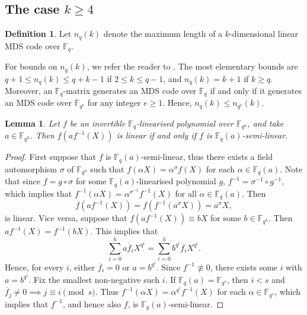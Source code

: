 \documentclass[a4paper]{article}
\newtheorem{lm}[thm]{Lemma}
\theoremstyle{definition}
\newtheorem{df}[thm]{Definition}
\newcommand{\FF}{\mathbb F}
\begin{document}
\subsection{The case $k \geq 4$}

\begin{df}
 Let \( n_q(k) \) denote the maximum length of a $k$-dimensional linear MDS code over $\FF_q$.
\end{df}

For bounds on \(n_q(k)\), we refer the reader to \cite{balllavrauw19}.
The most elementary bounds are \( q+1 \leq n_q(k)  \leq q+k-1 \) if $2 \leq k \leq q-1$, and $n_q(k) = k+1$ if $k \geq q$.
Moreover, an $\FF_q$-matrix generates an MDS code over $\FF_q$ if and only if it generates an MDS code over $\FF_{q^e}$ for any integer $e \geq 1$.
Hence, \( n_q(k) \leq n_{q^e}(k) \).

\begin{lm}
 \label{LmSemiLin}
 Let $f$ be an invertible $\FF_q$-linearised polynomial over $\FF_{q^h}$, and take $a \in \FF_{q^h}$.
 Then $f(a f^{-1}(X))$ is linear if and only if $f$ is $\FF_q(a)$-semi-linear.
\end{lm}

\begin{proof}
First suppose that $f$ is $\FF_q(a)$-semi-linear, thus there exists a field automorphism $\sigma$ of $\FF_{q^h}$ such that $f(\alpha X) = \alpha^\sigma f(X)$ for each $\alpha \in \FF_q(a)$.
Note that since $f = g \circ \sigma$ for some $\FF_q(a)$-linearised polynomial $g$, $f^{-1} = \sigma^{-1} \circ g^{-1}$, which implies that \( f^{-1}(\alpha X) = \alpha^{\sigma^{-1}} f^{-1}(X) \) for all $\alpha \in \FF_q(a)$.
Then
\[
 f( a f^{-1}(X)) = f ( f^{-1} (a^\sigma X)) = a^\sigma X,
\]
is linear.
Vice versa, suppose that \( f(a f^{-1}(X)) \equiv b X\) for some $b \in \FF_{q^h}$.
Then
\( a f^{-1}(X) = f^{-1}(b X) \).
This implies that
\[
 \sum_{i=0}^h a \overline f_i X^{q^i}
 = \sum_{i=0}^h b^{q^i} \overline f_i X^{q^i}.
\]
Hence, for every $i$, either $\overline f_i=0$ or $a = b^{q^i}$.
Since $f^{-1} \not \equiv 0$, there exists some $i$ with $a = b^{q^i}$.
Fix the smallest non-negative such $i$.
If $\FF_q(a) = \FF_{q^s}$, then $i < s$ and $\overline f_j \neq 0 \implies j \equiv i \pmod s$.
Thus $f^{-1}(\alpha X) = \alpha^{q^i} f^{-1}(X)$ for each $\alpha \in \FF_{q^s}$, which implies that $f^{-1}$, and hence also $f$, is $\FF_q(a)$-semi-linear.
\end{proof}
\end{document}
